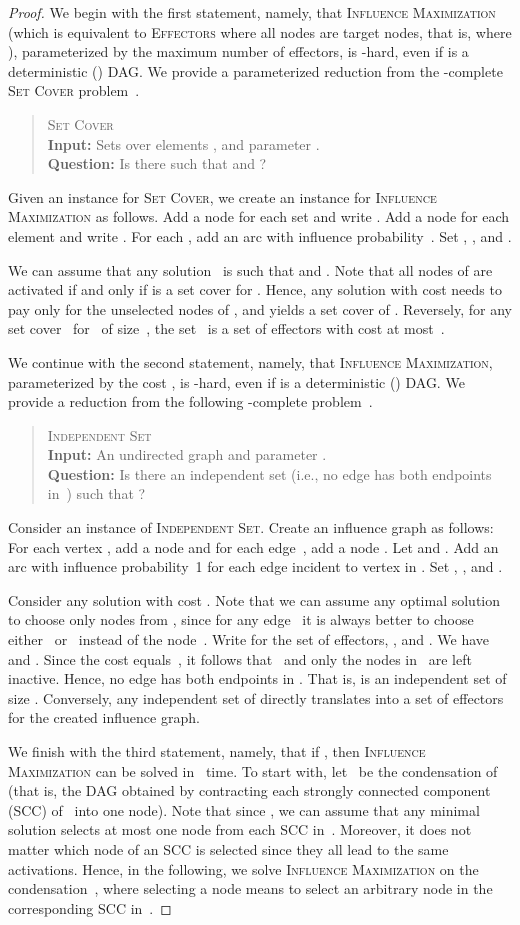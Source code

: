 \documentclass{article}
\newcommand{\probDef}[3]{
  \begin{quote}
    #1 \\
    \textbf{Input:} #2 \\
    \textbf{Question:} #3
  \end{quote}
}
\newcommand{\probSetCover}{\textsc{Set Cover}\xspace}
\newcommand{\probMaxIndependentSet}{\textsc{Independent Set}\xspace}
\newcommand{\probEffectors}{\textsc{Effectors}\xspace}
\begin{document}
\begin{proof}
  We begin with the first statement,
  namely,
  that \textsc{Influence Maximization}
  (which is equivalent to \probEffectors where all nodes are target nodes, that is, where ),
  parameterized by the maximum number  of effectors,
  is -hard, even if  is a deterministic () DAG.
  We provide a parameterized reduction from the -complete \probSetCover problem~\cite{DF13}.
  \probDef
    {\probSetCover}
    {Sets  over elements , and parameter .}
    {Is there  such that  and ?}
  Given an instance for \probSetCover, we
  create an instance for \textsc{Influence Maximization} as follows.
  Add a node  for each set  and write .
  Add a node  for each element  and write .
  For each , add an arc  with influence
  probability~.
  Set , , and .
  
  We can assume that any solution~ is such that   and  . 
  Note that all nodes of  are activated if and only if  is a set cover for .
  Hence, any solution with cost 
   needs to pay only for the unselected nodes of , and yields a set cover of .
  Reversely, for any set cover~ for~ of size~, the set~
  is a set of effectors with cost at most~.
  
  We continue with the second statement,
  namely,
  that \textsc{Influence Maximization},
  parameterized by the cost ,
  is -hard, even if  is a deterministic () DAG.
  We provide a reduction from the following -complete problem~\cite{DF13}.
  \probDef
    {\probMaxIndependentSet}
    {An undirected graph   and parameter .}
    {Is there an independent set  (i.e., no edge has both endpoints in~) such that ?}
  Consider an instance  of \probMaxIndependentSet. Create an influence graph as follows:
  For each vertex , add a node  and for each edge~, add a node . 
  Let  and .
  Add an arc  with influence probability~1 for each edge  incident to vertex  in . 
  Set , , and .
 
  Consider any solution with cost . 
  Note that we can assume any optimal solution to choose only nodes from , since for any edge~ it is always better to choose either~ or~ instead of the node~.
  Write  for the set of effectors, , and .
  We have  and .
  Since the cost equals~, it follows that~ and only the nodes in~ are left inactive. Hence, no edge  has both endpoints in . That is,  is an independent set of size . 
  Conversely, any independent set  of  directly translates into a set of effectors  for the created influence graph.  

  We finish with the third statement, namely, that if ,
  then \textsc{Influence Maximization} can be solved in~ time.
  To start with, let~ be the condensation of  (that is, the DAG obtained by contracting each strongly connected component (SCC) of~ into one node). 
  Note that since , we can assume that any minimal solution selects at most one node from each SCC in~. Moreover, it does not matter which node of an SCC is selected since they all lead to the same activations.
  Hence, in the following, we solve \textsc{Influence Maximization} on the condensation~,
  where selecting a node means to select an arbitrary node in the corresponding SCC in~.
  

\end{proof}
\end{document}
